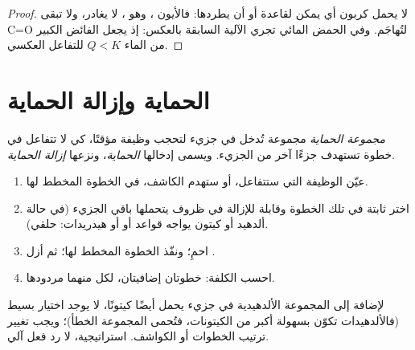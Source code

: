 \begin{proof}
لا يحمل كربون  أي  يمكن لقاعدة أو 
أن يطردها: فالأيون ، وهو ، لا يغادر، ولا تبقى C=O
لتُهاجَم. وفي الحمض المائي تجري الآلية السابقة بالعكس: إذ يجعل
الفائض الكبير من الماء $Q < K$ للتفاعل العكسي.
\end{proof}

\section{الحماية وإزالة الحماية}

\begin{definition}\label{def:b1:acetals-protection:protecting-group}
\emph{مجموعة الحماية} مجموعة تُدخل
في جزيء لتحجب وظيفة مؤقتًا، كي لا تتفاعل
في خطوة تستهدف جزءًا آخر من الجزيء. ويسمى إدخالها
\emph{الحماية}، ونزعها
\emph{إزالة الحماية}.
\end{definition}

\begin{method}\label{met:b1:acetals-protection:protect}
\begin{enumerate}
  \item عيّن الوظيفة التي ستتفاعل، أو ستهدم
        الكاشف، في الخطوة المخطط لها.
  \item اختر  ثابتة في تلك الخطوة وقابلة للإزالة في
        ظروف يتحملها باقي الجزيء (في حالة ألدهيد أو
        كيتون يواجه قواعد أو  أو هيدريدات:  حلقي).
  \item احمِ؛ ونفّذ الخطوة المخطط لها؛ ثم أزل .
  \item احسب الكلفة: خطوتان إضافيتان، لكل منهما مردودها.
\end{enumerate}
\end{method}

\begin{example}\label{ex:b1:acetals-protection:ketoester}
لإضافة  إلى المجموعة الألدهيدية في جزيء يحمل أيضًا
كيتونًا، لا يوجد اختيار بسيط  (فالألدهيدات تكوّن 
بسهولة أكبر من الكيتونات، فتُحمى المجموعة الخطأ)؛ ويجب تغيير
ترتيب الخطوات أو الكواشف. 
استراتيجية، لا رد فعل آلي.
\end{example}

